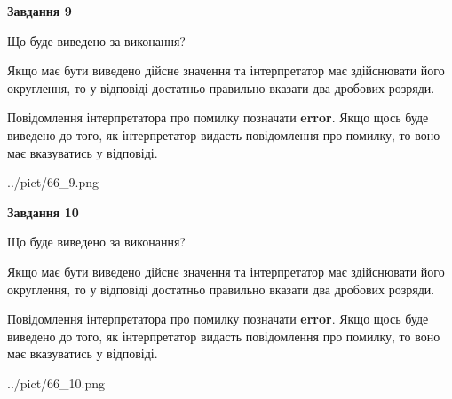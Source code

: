 \documentclass[12pt, ukrainian]{article}
\begin{document}
{\begin {Large}
{\begin {center}\textbf{Завдання 9}\end {center}}\par
Що буде виведено за виконання? \par

Якщо має бути виведено дійсне значення та інтерпретатор має здійснювати його округлення, 
то у відповіді достатньо правильно вказати два дробових розряди.

Повідомлення інтерпретатора про помилку позначати \textbf{error}.
Якщо щось буде виведено до того, як інтерпретатор видасть повідомлення про помилку, 
то воно має вказуватись у відповіді. \par

\begin{center}
	{../pict/66_9.png}
\end{center}
\newpage

{\begin {center}\textbf{Завдання 10}\end {center}}\par
Що буде виведено за виконання? \par

Якщо має бути виведено дійсне значення та інтерпретатор має здійснювати його округлення, 
то у відповіді достатньо правильно вказати два дробових розряди.

Повідомлення інтерпретатора про помилку позначати \textbf{error}.
Якщо щось буде виведено до того, як інтерпретатор видасть повідомлення про помилку, 
то воно має вказуватись у відповіді. \par

\begin{center}
	{../pict/66_10.png}
\end{center}
\newpage

\end {Large}}
\end{document}
